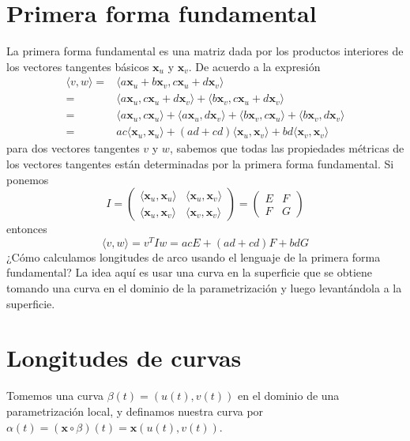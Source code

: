 \documentclass[spanish]{book}
\theoremstyle{definition}
\begin{document}
\section{Primera forma fundamental}
La primera forma fundamental es una matriz dada por los productos interiores de los vectores tangentes básicos $\mathbf{x}_u$ y $\mathbf{x}_v$. De acuerdo a la expresión
\begin{align*}
	\langle v,w\rangle=&\langle a\mathbf{x}_u+b\mathbf{x}_v,c\mathbf{x}_u+d\mathbf{x}_v\rangle\\
	=&\langle a\mathbf{x}_u,c\mathbf{x}_u+d\mathbf{x}_v\rangle+\langle b\mathbf{x}_v,c\mathbf{x}_u+d\mathbf{x}_v\rangle\\
	=&\langle a\mathbf{x}_u,c\mathbf{x}_u\rangle+\langle a\mathbf{x}_u,d\mathbf{x}_v\rangle+\langle b\mathbf{x}_v,c\mathbf{x}_u\rangle+\langle b\mathbf{x}_v,d\mathbf{x}_v\rangle\\
	=&ac\langle\mathbf{x}_u,\mathbf{x}_u\rangle+(ad+cd)\langle\mathbf{x}_u,\mathbf{x}_v\rangle+bd\langle\mathbf{x}_v,\mathbf{x}_v\rangle
\end{align*}
para dos vectores tangentes $v$ y $w$, sabemos que todas las propiedades métricas de los vectores tangentes están determinadas por la primera forma fundamental. Si ponemos
\[I=\begin{pmatrix}\langle\mathbf{x}_u,\mathbf{x}_u\rangle&\langle\mathbf{x}_u,\mathbf{x}_v\rangle\\\langle\mathbf{x}_u,\mathbf{x}_v\rangle&\langle\mathbf{x}_v,\mathbf{x}_v\rangle\end{pmatrix}=\begin{pmatrix}E&F\\F&G\end{pmatrix}\]
entonces
\[\langle v,w\rangle=v^TIw=acE+(ad+cd)F+bdG\]
¿Cómo calculamos longitudes de arco usando el lenguaje de la primera forma fundamental? La idea aquí es usar  una curva en la superficie que se obtiene tomando una curva en el dominio de la parametrización y luego levantándola a la superficie.
\section{Longitudes de curvas}
Tomemos una curva $\beta(t)=(u(t),v(t))$ en el dominio de una parametrización local, y definamos  nuestra curva por $\alpha(t)=(\mathbf{x}\circ\beta)(t)=\mathbf{x}(u(t),v(t))$.
\end{document}
